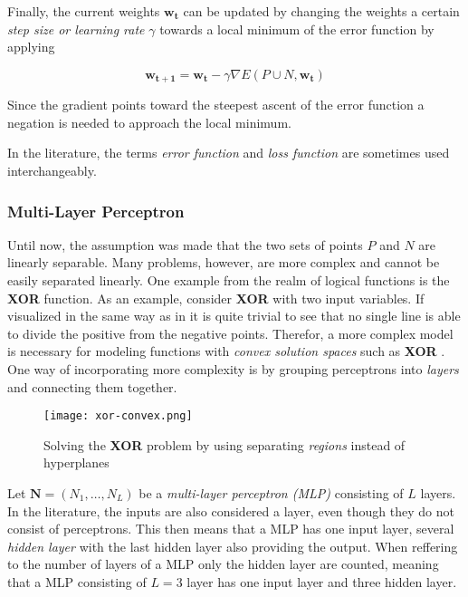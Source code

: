 Finally, the current weights $\bm{w_t}$ can be updated by changing the weights a certain \textit{step size or learning rate} $\gamma$ towards a local minimum of the error function by applying 

\begin{equation}
    \label{eq:gradient-binary-update}
    \bm{w_{t+1}} = \bm{w_t} - \gamma \nabla E(P \cup N, \bm{w_t})
\end{equation}

Since the gradient points toward the steepest ascent of the error function a negation is needed to approach the local minimum.

In the literature, the terms \textit{error function} and \textit{loss function} are sometimes used interchangeably.

\subsubsection{Multi-Layer Perceptron}
Until now, the assumption was made that the two sets of points $P$ and $N$ are linearly separable.
Many problems, however, are more complex and cannot be easily separated linearly.
One example from the realm of logical functions is the \textbf{XOR} function.
As an example, consider \textbf{XOR} with two input variables.
If visualized in the same way as in  it is quite trivial to see that no single line is able to divide the positive from the negative points.
Therefor, a more complex model is necessary for modeling functions with \textit{convex solution spaces} such as \textbf{XOR} .
One way of incorporating more complexity is by grouping perceptrons into \textit{layers} and connecting them together.

\begin{figure}[htb!]
    \centering
    \texttt{[image: xor-convex.png]}
    \caption{Solving the \textbf{XOR} problem by using separating \textit{regions} instead of hyperplanes \cite{rojas_neural_1996}}
    \label{fig:xor-convex}
\end{figure}

Let $\bm{N} = (N_1, \dots, N_L)$ be a \textit{multi-layer perceptron (MLP)} consisting of $L$ layers.
In the literature, the inputs are also considered a layer, even though they do not consist of perceptrons.
This then means that a MLP has one input layer, several \textit{hidden layer} with the last hidden layer also providing the output.
When reffering to the number of layers of a MLP only the hidden layer are counted, meaning that a MLP consisting of $L=3$ layer has one input layer and three hidden layer.


